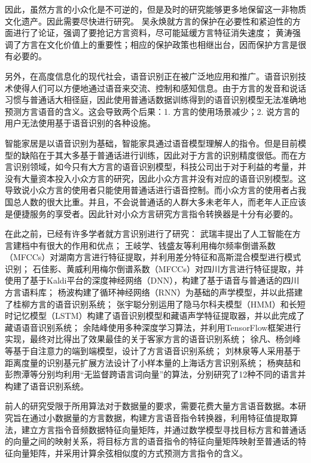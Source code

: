 \documentclass[lang=cn,cite=super]{elegantpaper}
\begin{document}
因此，虽然方言的小众化是不可逆的，但是及时的研究能够更多地保留这一非物质文化遗产。因此需要尽快进行研究。
吴永焕\cite{WuYonghuan}就方言的保护在必要性和紧迫性的方面进行了论证，强调了要抢记方言资料，尽可能延缓方言特征消失速度；
黄涛\cite{Huangtao}强调了方言在文化价值上的重要性；相应的保护政策也相继出台，因而保护方言是很有必要的。

另外，在高度信息化的现代社会，语音识别正在被广泛地应用和推广。语音识别技术使得人们可以方便地通过语音来交流、控制和感知信息。由于方言的发音和说话习惯与普通话大相径庭，因此使用普通话数据训练得到的语音识别模型无法准确地预测方言语音的含义。这会导致两个后果：1. 方言的使用场景减少；2. 说方言的用户无法使用基于语音识别的各种设施。

智能家居是以语音识别为基础，智能家具通过语音模型理解人的指令。但是目前模型的缺陷在于其大多基于普通话进行训练，因此对于方言的识别精度很低。而在方言识别领域，如今只有大方言的语音识别模型，科技公司出于对于利益的考量，并没有大量资本投入小众方言的研究，因此小众方言并没有对应的语音识别模型。这导致说小众方言的使用者只能使用普通话进行语音控制。而小众方言的使用者占我国总人数的很大比重。并且，不会说普通话的人群大多未老年人，而老年人正应该是便捷服务的享受者。因此针对小众方言研究方言指令转换器是十分有必要的。

在此之前，已经有许多学者就方言识别进行了研究：
武瑞丰\cite{WuRuiFeng}提出了人工智能在方言建档中有很大的作用和优点；
王岐学、钱盛友\cite{WangQiXue}等利用梅尔频率倒谱系数（MFCCs）对湖南方言进行特征提取，并利用差分特征和高斯混合模型进行模式识别；
石佳影、黄威\cite{ShiJiaYing2016}利用梅尔倒谱系数（MFCCs）对四川方言进行特征提取，并使用了基于Kaldi平台的深度神经网络（DNN），构建了基于语音与普通话的四川方言语料库；
杨波\cite{YangBo2019}构建了循环神经网络（RNN）为基础的声学模型，并以此搭建了桂柳方言的语音识别系统；
张宇聪\cite{ZhangYuCong2016}分别运用了隐马尔科夫模型（HMM）和长短时记忆模型（LSTM）构建了语音识别模型和藏语声学特征提取器，并以此完成了藏语语音识别系统；
余陆峰\cite{YuLuFeng2019}使用多种深度学习算法，并利用TensorFlow框架进行实现，最终对比得出了效果最佳的关于客家方言的语音识别系统；
徐凡、杨剑峰等\cite{XuFan2021}基于自注意力的端到端模型，设计了方言语音识别系统；
刘林泉等人\cite{LiuLinQuan2008}采用基于距离度量的识别基元扩展方法设计了小样本量的上海话方言识别系统；
杨奭喆\cite{YangShiZhe2020}和彭煦潭等\cite{peng2020}\cite{2021Cross}分别均利用“无监督跨语言词向量”的算法，分别研究了12种不同的语言并构建了语音识别系统。

前人的研究受限于所用算法对于数据量的要求，需要花费大量方言语音数据。本研究旨在通过小数据量的方言数据，构建方言语音指令转换器，利用特征值提取算法，建立方言指令音频数据特征向量矩阵，并通过数学模型寻找目标方言和普通话的向量之间的映射关系，将目标方言的语音指令的特征向量矩阵映射至普通话的特征向量矩阵，并采用计算余弦相似度的方式预测方言指令的含义。
\end{document}
